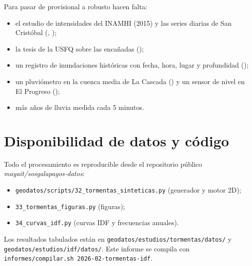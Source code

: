 \documentclass{sosg-informe}
\begin{document}
Para pasar de provisional a robusto hacen falta:
\begin{itemize}
  \item el estudio de intensidades del INAMHI (2015) y las series diarias de San Cristóbal (, );
  \item la tesis de la USFQ sobre las encañadas ();
  \item un registro de inundaciones históricas con fecha, hora, lugar y profundidad ();
  \item un pluviómetro en la cuenca media de La Cascada () y un sensor de nivel en El Progreso ();
  \item más años de lluvia medida cada 5 minutos.
\end{itemize}

\section*{Disponibilidad de datos y código}
{\small Todo el procesamiento es reproducible desde el repositorio público \emph{mayait/sosgalapagos-datos}:
\begin{itemize}
  \item \texttt{geodatos/scripts/32\_tormentas\_sinteticas.py} (generador y motor 2D);
  \item \texttt{33\_tormentas\_figuras.py} (figuras);
  \item \texttt{34\_curvas\_idf.py} (curvas IDF y frecuencias anuales).
\end{itemize}
Los resultados tabulados están en \texttt{geodatos/estudios/tormentas/datos/} y \texttt{geodatos/estudios/idf/datos/}. Este informe se compila con \texttt{informes/compilar.sh 2026-02-tormentas-idf}.\par}



\end{document}
